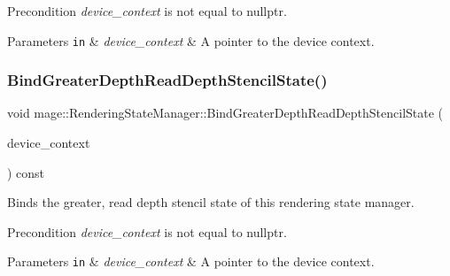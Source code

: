 \begin{DoxyPrecond}{Precondition}
{\itshape device\+\_\+context} is not equal to {\ttfamily nullptr}. 
\end{DoxyPrecond}

\begin{DoxyParams}[1]{Parameters}
\mbox{\tt in}  & {\em device\+\_\+context} & A pointer to the device context. \\
\hline
\end{DoxyParams}
\hypertarget{classmage_1_1_rendering_state_manager_a52ea438f9dde2d461a038932dd104ef8}{}\label{classmage_1_1_rendering_state_manager_a52ea438f9dde2d461a038932dd104ef8} 
\subsubsection{\texorpdfstring{Bind\+Greater\+Depth\+Read\+Depth\+Stencil\+State()}{BindGreaterDepthReadDepthStencilState()}}
{\footnotesize\ttfamily void mage\+::\+Rendering\+State\+Manager\+::\+Bind\+Greater\+Depth\+Read\+Depth\+Stencil\+State (\begin{DoxyParamCaption}\item[{I\+D3\+D11\+Device\+Context4 $\ast$}]{device\+\_\+context }\end{DoxyParamCaption}) const\hspace{0.3cm}{\ttfamily [noexcept]}}

Binds the greater, read depth stencil state of this rendering state manager.

\begin{DoxyPrecond}{Precondition}
{\itshape device\+\_\+context} is not equal to {\ttfamily nullptr}. 
\end{DoxyPrecond}

\begin{DoxyParams}[1]{Parameters}
\mbox{\tt in}  & {\em device\+\_\+context} & A pointer to the device context. \\
\hline
\end{DoxyParams}
\hypertarget{classmage_1_1_rendering_state_manager_aecae68a287ff478e7dcd75293c3e28cf}{}\label{classmage_1_1_rendering_state_manager_aecae68a287ff478e7dcd75293c3e28cf} 
